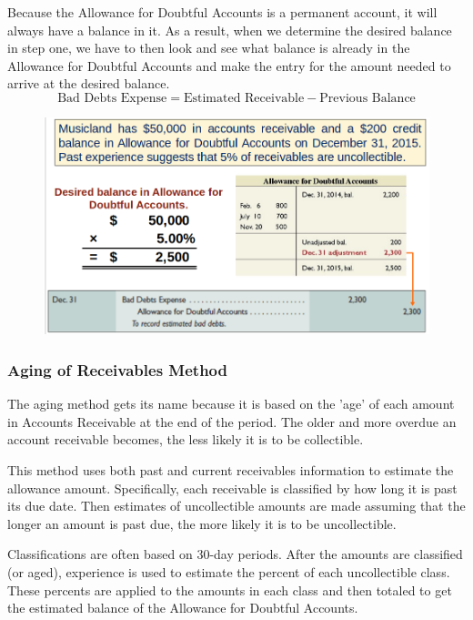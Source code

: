 \documentclass[../main.tex]{subfiles}
\begin{document}
	Because the Allowance for Doubtful Accounts is a permanent account, it will 
	always have a balance in it.  As a result, when we determine the desired 
	balance in step one, we have to then look and see what balance is already 
	in the Allowance for Doubtful Accounts and make the entry for the amount 
	needed to arrive at the desired balance.
	\[
	\text{Bad Debts Expense} = \text{Estimated Receivable} - \text{Previous 
	Balance}
	\]
	
	\begin{figure}[ht]
		\centering
		\includegraphics[width=\columnwidth]{images/c6/percent_receivables_eg.png}
	\end{figure}
	
	\subsubsection{Aging of Receivables Method}
	
	The aging method gets its name because it is based on the 'age' of each 
	amount in Accounts Receivable at the end of the period. The older and more 
	overdue an account receivable becomes, the less likely it is to be 
	collectible. 
	
	 This method uses both past and current receivables information to estimate 
	 the allowance amount. Specifically, each receivable is classified by how 
	 long it is past its due date. Then estimates of uncollectible amounts are 
	 made assuming that the longer an amount is past due, the more likely it is 
	 to be uncollectible. 
	 
	 Classifications are often based on 30-day periods. 
	 After the amounts are classified (or aged), experience is used to estimate 
	 the percent of each uncollectible class. These percents are applied to the 
	 amounts in each class and then totaled to get the estimated balance of the 
	 Allowance for Doubtful Accounts.
	 
\end{document}
